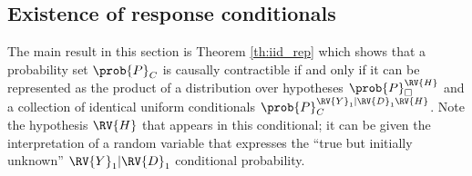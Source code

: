 





\subsection{Existence of response conditionals}

The main result in this section is Theorem \ref{th:iid_rep} which shows that a probability set $\prob{P}_C$ is causally contractible if and only if it can be represented as the product of a distribution over hypotheses $\prob{P}_\square^{\RV{H}}$ and a collection of identical uniform conditionals $\prob{P}_C^{\RV{Y}_1|\RV{D}_1\RV{H}}$. Note the hypothesis $\RV{H}$ that appears in this conditional; it can be given the interpretation of a random variable that expresses the ``true but initially unknown'' $\RV{Y}_1|\RV{D}_1$ conditional probability.


